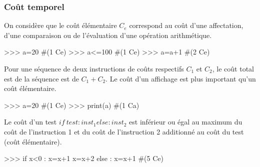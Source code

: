 \begin{frame}[fragile]
\frametitle{Coût temporel}

\begin{minipage}{0.65\linewidth}
On considère que le coût élémentaire $C_e$ correspond au coût d'une affectation, d'une comparaison ou de l'évaluation d'une opération arithmétique.
\end{minipage}\hfill
\begin{minipage}{0.3\linewidth}
\begin{GrayBox}[0.85\textwidth]
\begin{verbatimtab}[3]
>>> a=20 #(1 Ce)
>>> a<=100 #(1 Ce)
>>> a=a+1 #(2 Ce)
\end{verbatimtab}
\end{GrayBox}
\end{minipage}

\begin{minipage}{0.65\linewidth}
Pour une séquence de deux instructions de coûts respectifs $C_1$ et $C_2$, le coût total est de la séquence est de $C_1+C_2$. Le coût d'un affichage est plus important qu'un coût élémentaire.
\end{minipage}\hfill
\begin{minipage}{0.3\linewidth}
\begin{GrayBox}[0.85\textwidth]
\begin{verbatimtab}[3]
>>> a=20 #(1 Ce)
>>> print(a)  #(1 Ca)
\end{verbatimtab}
\end{GrayBox}
\end{minipage}

\begin{minipage}{0.65\linewidth}
Le coût d'un test $if\ test : inst_1 else : inst_2$ est inférieur ou égal au maximum du coût de l'instruction 1 et du coût de l'instruction 2 additionné au coût du test (coût élémentaire).
\end{minipage}\hfill
\begin{minipage}{0.3\linewidth}
\begin{GrayBox}[0.85\textwidth]
\begin{verbatimtab}[3]
>>> if x<0 :
		x=x+1
		x=x+2
	else :
		x=x+1  #(5 Ce)
\end{verbatimtab}
\end{GrayBox}
\end{minipage}
\end{frame}

